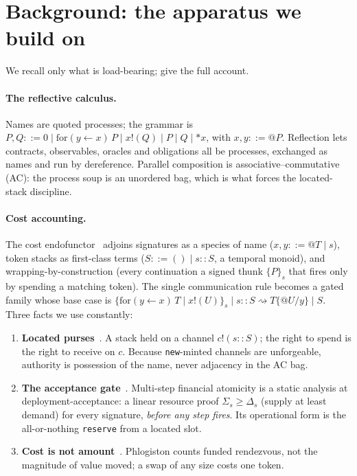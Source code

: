 \documentclass[11pt]{article}
\theoremstyle{definition}
\begin{document}
\section{Background: the apparatus we build on}\label{sec:background}

We recall only what is load-bearing; \cite{rho,cost,cigslt,finrho} give the full account.

\paragraph{The reflective calculus.}
Names are quoted processes; the grammar is
$P,Q ::= 0 \mid \mathrm{for}(y \leftarrow x)\,P \mid x!(Q) \mid P \mid Q \mid {\ast}x$, with
$x,y ::= @P$. Reflection lets contracts, observables, oracles and obligations all be processes,
exchanged as names and run by dereference. Parallel composition is associative--commutative (AC):
the process soup is an unordered bag, which is what forces the located-stack discipline.

\paragraph{Cost accounting.}
The cost endofunctor~\cite{cigslt} adjoins signatures as a species of name
($x,y ::= @T \mid s$), token stacks as first-class terms ($S ::= () \mid s\!::\!S$, a temporal
monoid), and wrapping-by-construction (every continuation a signed thunk $\{P\}_s$ that fires only
by spending a matching token). The single communication rule becomes a gated family whose base case
is $\{\mathrm{for}(y \leftarrow x)\,T \mid x!(U)\}_s \mid s\!::\!S \rightsquigarrow T\{@U/y\} \mid S$.
Three facts we use constantly:
\begin{enumerate}[label=(\roman*),leftmargin=2em]
\item \textbf{Located purses}~\cite[\S3.2]{finrho}. A stack held on a channel $c!(s\!::\!S)$; the
right to spend is the right to receive on $c$. Because \texttt{new}-minted channels are unforgeable,
authority is possession of the name, never adjacency in the AC bag.
\item \textbf{The acceptance gate}~\cite[\S8.5]{cost}. Multi-step financial atomicity is a static
analysis at deployment-acceptance: a linear resource proof $\Sigma_s \ge \Delta_s$ (supply at least
demand) for every signature, \emph{before any step fires}. Its operational form is the all-or-nothing
\texttt{reserve} from a located slot.
\item \textbf{Cost is not amount}~\cite[\S3.6]{finrho}. Phlogiston counts funded rendezvous, not the
magnitude of value moved; a swap of any size costs one token.
\end{enumerate}
\end{document}
